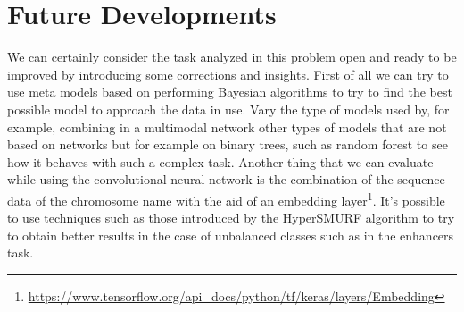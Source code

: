 \documentclass{article}
\begin{document}
\section{Future Developments}
\label{sec:Future Developments}
We can certainly consider the task analyzed in this problem open and ready to be improved by introducing some corrections and insights. First of all we can try to use meta models based on performing Bayesian algorithms to try to find the best possible model to approach the data in use. Vary the type of models used by, for example, combining in a multimodal network other types of models that are not based on networks but for example on binary trees, such as random forest to see how it behaves with such a complex task. Another thing that we can evaluate while using the convolutional neural network is the combination of the sequence data of the chromosome name with the aid of an embedding layer\footnote{\url{https://www.tensorflow.org/api_docs/python/tf/keras/layers/Embedding}}. It's possible to use techniques such as those introduced by the HyperSMURF\cite{HyperSMURF} algorithm to try to obtain better results in the case of unbalanced classes such as in the enhancers task.

\clearpage
\printglossary[type=\acronymtype]



\end{document}
